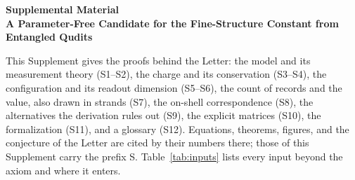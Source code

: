 \clearpage
\onecolumngrid
\begin{center}
\textbf{\large Supplemental Material}\\[4pt]
\textbf{A Parameter-Free Candidate for the Fine-Structure Constant from Entangled Qudits}
\end{center}
\bigskip

\setcounter{equation}{0}
\setcounter{table}{0}
\setcounter{figure}{0}
\setcounter{theorem}{0}
\setcounter{lemma}{0}
\setcounter{corollary}{0}
\setcounter{secnumdepth}{1}
\renewcommand{\thesection}{S\arabic{section}}
\def\UrlBreaks{\do\.\do\_}
\newcommand{\lean}[1]{\nolinkurl{#1}}

This Supplement gives the proofs behind the Letter: the model and its measurement theory (S1--S2), the charge and its conservation (S3--S4), the configuration and its readout dimension (S5--S6), the count of records and the value, also drawn in strands (S7), the on-shell correspondence (S8), the alternatives the derivation rules out (S9), the explicit matrices (S10), the formalization (S11), and a glossary (S12). Equations, theorems, figures, and the conjecture of the Letter are cited by their numbers there; those of this Supplement carry the prefix S. Table~\ref{tab:inputs} lists every input beyond the axiom and where it enters.

